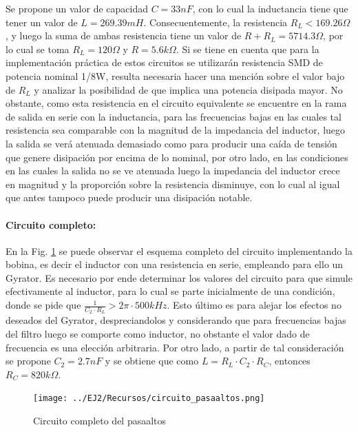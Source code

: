 Se propone un valor de capacidad $C = 33nF$, con lo cual la inductancia tiene que tener un valor de $L = 269.39mH$. Consecuentemente, la resistencia $R_L < 169.26 \Omega$, y luego la suma de ambas resistencia
tiene un valor de $R + R_L = 5714.3 \Omega$, por lo cual se toma $R_L = 120 \Omega$ y $R = 5.6k\Omega$. Si se tiene en cuenta que para la implementaci\'on pr\'actica de estos circuitos se utilizar\'an resistencia SMD
de potencia nominal 1/8W, resulta necesaria hacer una menci\'on sobre el valor bajo de $R_L$ y analizar la posibilidad de que implica una potencia disipada mayor. No obstante, como esta resistencia en el circuito equivalente se encuentre en la rama de 
salida en serie con la inductancia, para las frecuencias bajas en las cuales tal resistencia sea comparable con la magnitud de la impedancia del inductor, luego la salida se ver\'a atenuada demasiado como para producir una ca\'ida de tensi\'on que genere disipaci\'on
por encima de lo nominal, por otro lado, en las condiciones en las cuales la salida no se ve atenuada luego la impedancia del inductor crece en magnitud y la proporci\'on sobre la resistencia disminuye, con lo cual al igual que antes tampoco puede producir una disipaci\'on notable.

\paragraph*{Circuito completo:} En la Fig. \ref{fig:circuito_pasaaltos} se puede observar el esquema completo del circuito implementando la bobina, es decir el inductor con una resistencia en serie, empleando para ello un Gyrator.
Es necesario por ende determinar los valores del circuito para que simule efectivamente al inductor, para lo cual se parte inicialmente de una condici\'on, donde se pide que $\frac{1}{C_2 \cdot R_L} > 2 \pi \cdot 500kHz$. Esto \'ultimo es para alejar los efectos no deseados del Gyrator, despreciandolos
y considerando que para frecuencias bajas del filtro luego se comporte como inductor, no obstante el valor dado de frecuencia es una elecci\'on arbitraria. Por otro lado, a partir de tal consideraci\'on se propone $C_2 = 2.7nF$ y se obtiene que como $L = R_L \cdot C_2 \cdot R_C$, entonces $R_C = 820k\Omega$.

\begin{figure}[H]
    \centering
    \texttt{[image: ../EJ2/Recursos/circuito\_pasaaltos.png]}
    \caption{Circuito completo del pasaaltos}
    \label{fig:circuito_pasaaltos}
\end{figure}

